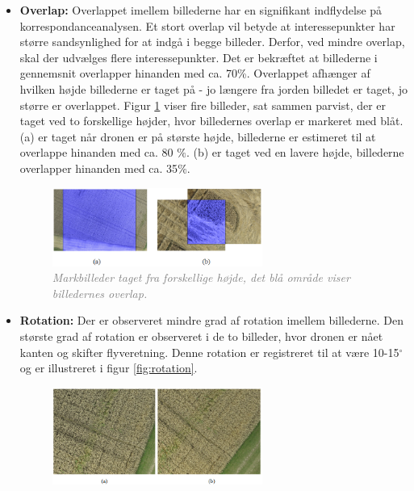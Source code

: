 \begin{itemize}
\item{\textbf{Overlap:} Overlappet imellem billederne har en signifikant indflydelse på korrespondanceanalysen. Et stort overlap vil betyde at interessepunkter har større sandsynlighed for at indgå i begge billeder. Derfor, ved mindre overlap, skal der udvælges flere interessepunkter. Det er bekræftet at billederne i gennemsnit overlapper hinanden med ca. 70\%. Overlappet afhænger af hvilken højde billederne er taget på - jo længere fra jorden billedet er taget, jo større er overlappet. Figur \ref{fig:overlap} viser fire billeder, sat sammen parvist, der er taget ved to forskellige højder, hvor billedernes overlap er markeret med blåt. (a) er taget når dronen er på største højde, billederne er estimeret til at overlappe hinanden med ca. 80 $\%$. (b) er taget ved en lavere højde, billederne overlapper hinanden med ca. 35$\%$.
\begin{figure}[H]
    \centering
    \includegraphics[width=0.65\textwidth]{fig/17.png}
     \vspace{-1em}
    \begin{center}    
       \caption{\textcolor{gray}{\footnotesize \textit{Markbilleder taget fra forskellige højde, det blå område viser billedernes overlap.}}}
    \label{fig:overlap}
     \end{center}
     \vspace{-2.5em}
  \end{figure} \noindent }
\item{\textbf{Rotation:} Der er observeret mindre grad af rotation imellem billederne.
Den største grad af rotation er observeret i de to billeder, hvor dronen er nået kanten og skifter flyveretning. Denne rotation er registreret til at være 10-15$^{\circ}$ og er illustreret i figur \ref{fig:rotation}.
\begin{figure}[H]
    \centering
    \includegraphics[width=0.65\textwidth]{fig/19.png}

\end{figure}}
\end{itemize}

